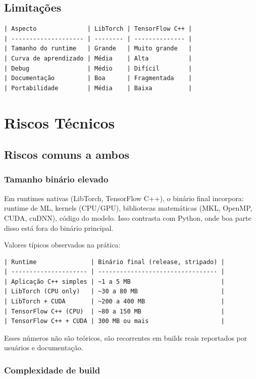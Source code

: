 \subsection{Limitações}
\begin{verbatim}
| Aspecto              | LibTorch | TensorFlow C++ |
| -------------------- | -------- | -------------- |
| Tamanho do runtime   | Grande   | Muito grande   |
| Curva de aprendizado | Média    | Alta           |
| Debug                | Médio    | Difícil        |
| Documentação         | Boa      | Fragmentada    |
| Portabilidade        | Média    | Baixa          |

\end{verbatim}

\section{Riscos Técnicos}

\subsection{Riscos comuns a ambos}

\subsubsection{Tamanho binário elevado} 

Em runtimes nativas (LibTorch, TensorFlow C++), o binário final incorpora: runtime de ML, kernels (CPU/GPU), bibliotecas matemáticas (MKL, OpenMP, CUDA, cuDNN), código do modelo. Isso contrasta com Python, onde boa parte disso está fora do binário principal.

Valores típicos observados na prática:
\begin{verbatim}
| Runtime               | Binário final (release, stripado) |
| --------------------- | --------------------------------- |
| Aplicação C++ simples | ~1 a 5 MB                         |
| LibTorch (CPU only)   | ~30 a 80 MB                       |
| LibTorch + CUDA       | ~200 a 400 MB                     |
| TensorFlow C++ (CPU)  | ~80 a 150 MB                      |
| TensorFlow C++ + CUDA | 300 MB ou mais                    |
\end{verbatim}

Esses números não são teóricos, são recorrentes em builds reais reportados por usuários e documentação.

\subsubsection{Complexidade de build}


